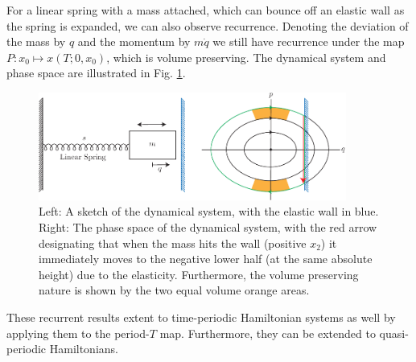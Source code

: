\begin{ex}
	For a linear spring with a mass attached, which can bounce off an elastic wall as the spring is expanded, we can also observe recurrence. Denoting the deviation of the mass by $q$ and the momentum by $m\dot{q}$ we still have recurrence under the map $P:x_0 \mapsto x(T;0, x_0)$, which is volume preserving. The dynamical system and phase space are illustrated in Fig. \ref{fig:bouncy_wall_spring}.
	 \begin{figure}[h!]
		\centering
		\includegraphics[width=0.9\textwidth]{figures/ch8/13bouncy_wall.pdf}
		\caption{Left: A sketch of the dynamical system, with the elastic wall in blue. Right: The phase space of the dynamical system, with the red arrow designating that when the mass hits the wall (positive $x_2$) it immediately moves to the negative lower half (at the same absolute height) due to the elasticity. Furthermore, the volume preserving nature is shown by the two equal volume orange areas.}
		\label{fig:bouncy_wall_spring}
	\end{figure}

	\begin{remark}[]
		These recurrent results extent to time-periodic Hamiltonian systems as well by applying them to the period-$T$ map. Furthermore, they can be extended to quasi-periodic Hamiltonians.
	\end{remark}
	
\end{ex}

